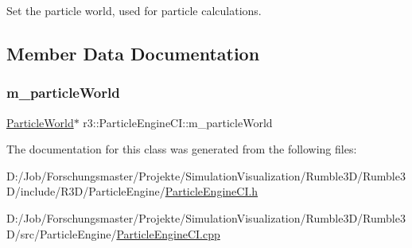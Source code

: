 Set the particle world, used for particle calculations. 

\subsection{Member Data Documentation}
\mbox{\label{classr3_1_1_particle_engine_c_i_ad13321df475d526a7a2ed34e46cc10ee}} 
\subsubsection{\texorpdfstring{m\+\_\+particle\+World}{m\_particleWorld}}
{\footnotesize\ttfamily \mbox{\hyperlink{classr3_1_1_particle_world}{Particle\+World}}$\ast$ r3\+::\+Particle\+Engine\+C\+I\+::m\+\_\+particle\+World\hspace{0.3cm}{\ttfamily [protected]}}



The documentation for this class was generated from the following files\+:\begin{DoxyCompactItemize}
\item 
D\+:/\+Job/\+Forschungsmaster/\+Projekte/\+Simulation\+Visualization/\+Rumble3\+D/\+Rumble3\+D/include/\+R3\+D/\+Particle\+Engine/\mbox{\hyperlink{_particle_engine_c_i_8h}{Particle\+Engine\+C\+I.\+h}}\item 
D\+:/\+Job/\+Forschungsmaster/\+Projekte/\+Simulation\+Visualization/\+Rumble3\+D/\+Rumble3\+D/src/\+Particle\+Engine/\mbox{\hyperlink{_particle_engine_c_i_8cpp}{Particle\+Engine\+C\+I.\+cpp}}\end{DoxyCompactItemize}
